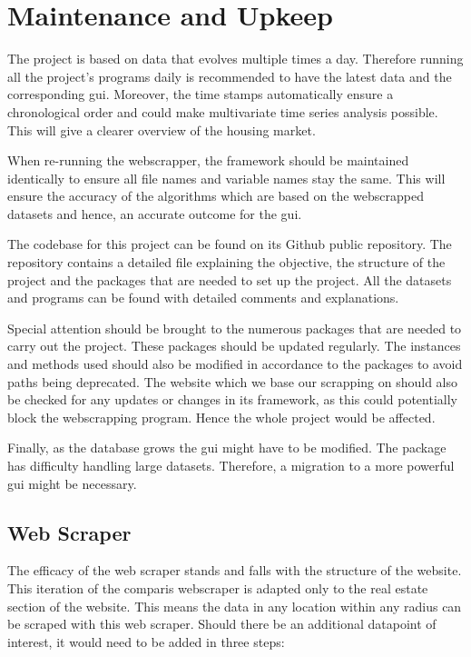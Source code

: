 \documentclass[main]{subfiles}
\begin{document}
\section{Maintenance and Upkeep}



The project is based on data that evolves multiple times a day. 
Therefore running all the project's programs daily is recommended to have the latest data and the corresponding \ac{gui}. 
Moreover, the time stamps automatically ensure a chronological order and could make multivariate time series analysis possible.
This will give a clearer overview of the housing market. \par
When re-running the webscrapper, the framework should be maintained identically to ensure all file names and variable names stay the same. 
This will ensure the accuracy of the algorithms which are based on the webscrapped datasets and hence, an accurate outcome for the \ac{gui}. \par
The codebase for this project can be found on its Github public repository. 
The repository contains a detailed \pkg[readme.md] file explaining the objective, 
the structure of the project and the packages that are needed to set up the project. 
All the datasets and programs can be found with detailed comments and explanations.\par
Special attention should be brought to the numerous packages that are needed to carry out the project. 
These packages should be updated regularly. 
The instances and methods used should also be modified in accordance to the packages to avoid paths being deprecated.
The website which we base our scrapping on should also be checked for any updates or changes in its framework, 
as this could potentially block the webscrapping program. Hence the whole project would be affected.\par
Finally, as the database grows the \ac{gui} might have to be modified. 
The \pkg[tkinter] package has difficulty handling large datasets.
Therefore, a migration to a more powerful \ac{gui} might be necessary.

\subsection{Web Scraper}
The efficacy of the web scraper stands and falls with the structure of the website.
This iteration of the comparis webscraper is adapted only to the real estate section of the website.
This means the data in any location within any radius can be scraped with this web scraper.
Should there be an additional datapoint of interest,
it would need to be added in three steps:
\end{document}
